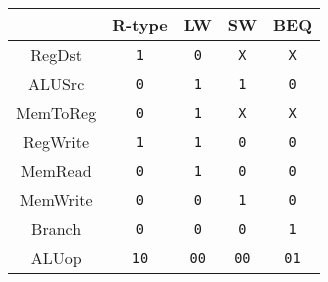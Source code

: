 \centering
\begin{tabular}[t]{ccccc}
    \toprule
             & R-type      & LW          & SW          & BEQ         \\
    \midrule
    RegDst   & \texttt{1}  & \texttt{0}  & \texttt{X}  & \texttt{X}  \\
    ALUSrc   & \texttt{0}  & \texttt{1}  & \texttt{1}  & \texttt{0}  \\
    MemToReg & \texttt{0}  & \texttt{1}  & \texttt{X}  & \texttt{X}  \\
    RegWrite & \texttt{1}  & \texttt{1}  & \texttt{0}  & \texttt{0}  \\
    MemRead  & \texttt{0}  & \texttt{1}  & \texttt{0}  & \texttt{0}  \\
    MemWrite & \texttt{0}  & \texttt{0}  & \texttt{1}  & \texttt{0}  \\
    Branch   & \texttt{0}  & \texttt{0}  & \texttt{0}  & \texttt{1}  \\
    ALUop    & \texttt{10} & \texttt{00} & \texttt{00} & \texttt{01} \\
    \bottomrule
\end{tabular}
